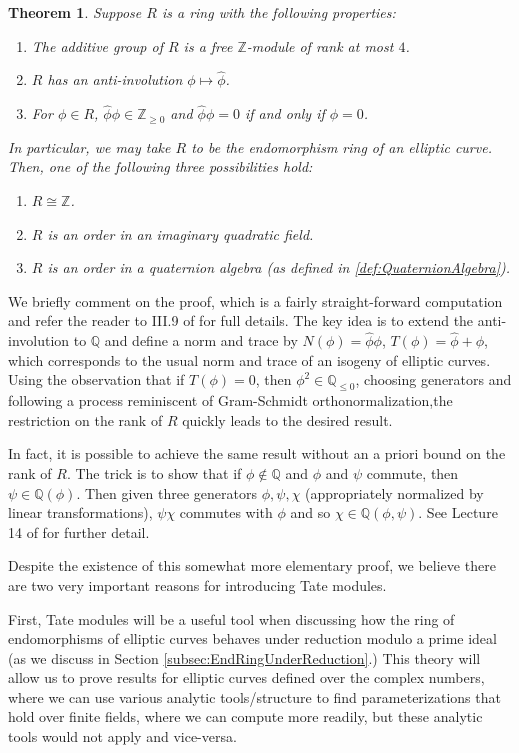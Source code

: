 \documentclass{amsart}
\newtheorem{thm}{Theorem}[section]
\theoremstyle{definition}
\theoremstyle{remark}
\numberwithin{equation}{section}
\newcommand{\bbQ}{\mathbb Q}
\newcommand{\bbZ}{\mathbb Z}
\begin{document}
\begin{thm} \label{thm:PossibleEndomorphismRings}
Suppose $R$ is a ring with the following properties:
\begin{enumerate}
\item The additive group of $R$ is a free $\bbZ$-module of rank at most $4$.
\item $R$ has an anti-involution $\phi \mapsto \widehat{\phi}$.
\item For $\phi \in R$, $\widehat{\phi}\phi  \in \bbZ_{\geq 0}$ and $ \widehat{\phi}\phi = 0$ if and only if $\phi = 0$.
\end{enumerate}
In particular, we may take $R$ to be the endomorphism ring of an elliptic curve. Then, one of the following three possibilities hold:
\begin{enumerate}
\item $R \cong \bbZ$.
\item $R$ is an order in an imaginary quadratic field.
\item $R$ is an order in a quaternion algebra (as defined in \ref{def:QuaternionAlgebra}).
\end{enumerate}
\end{thm}

We briefly comment on the proof, which is a fairly straight-forward computation and refer the reader to III.9 of \cite{SilvermanAEC} for full details. The key idea is to extend the anti-involution to $\bbQ$ and define a norm and trace by $N(\phi) = \widehat{\phi}\phi$, $T(\phi) = \widehat{\phi} + \phi$, which corresponds to the usual norm and trace of an isogeny of elliptic curves. Using the observation that if $T(\phi) = 0$, then $\phi^2 \in \bbQ_{\leq 0}$, choosing generators and following a process reminiscent of Gram-Schmidt orthonormalization,the restriction on the rank of $R$ quickly leads to the desired result.

 In fact, it is possible to achieve the same result without an a priori bound on the rank of $R$. The trick is to show that if $\phi \notin \bbQ$ and $\phi$ and $\psi$ commute, then $\psi \in \bbQ(\phi)$. Then given three generators $\phi, \psi, \chi$ (appropriately normalized by linear transformations), $\psi\chi$ commutes with $\phi$ and so $\chi \in \bbQ(\phi, \psi)$. See Lecture 14 of \cite{SutherlandLN}
for further detail. 

Despite the existence of this somewhat more elementary proof, we believe there are two very important reasons for introducing Tate modules.
 
 First, Tate modules will be a useful tool when discussing how the ring of endomorphisms of elliptic curves behaves under reduction modulo a prime ideal (as we discuss in Section \ref{subsec:EndRingUnderReduction}.) This theory will allow us to prove results for elliptic curves defined over the complex numbers, where we can use various analytic tools/structure to find parameterizations that hold over finite fields, where we can compute more readily, but these analytic tools would not apply and vice-versa. 
 
\end{document}
